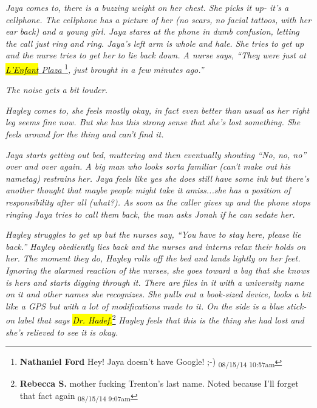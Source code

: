 \textit{Jaya comes to, there is a buzzing weight on her chest.  She picks it up- it's a cellphone.  The cellphone has a picture of her (}\textit{no scars, no facial tattoos, with her ear back}\textit{) and a young girl.  Jaya stares at the phone in dumb confusion, letting the call just ring and ring.  Jaya's left arm is whole and hale.  She tries to get up and the nurse tries to get her to lie back down.  A nurse says, ``They were just at }\underline{ \textit{ {\color[RGB]{17,85,204}\hl{L'Enfant} } }\underline{ \textit{ {\color[RGB]{17,85,204} } } }\underline{ \textit{ {\color[RGB]{17,85,204}Plaza}} } }\footnote{\textbf{Nathaniel Ford }Hey! Jaya doesn't have Google! ;-) \textsubscript{08/15/14 10:57am}}\textit{, just brought in a few minutes ago.''}



\textit{The noise gets a bit louder.  }



\textit{Hayley comes to, she feels mostly okay, in fact even better than usual as her right leg seems fine now.  But she has this strong sense that she's lost something.  She feels around for the thing and can't find it. }



\textit{Jaya starts getting out bed, muttering and then eventually shouting ``No, no, no'' over and over again.  A big man who looks sorta familiar (can't make out his nametag) restrains her.  Jaya feels like yes she does still have some ink but there's another thought that maybe people might take it amiss...she has a position of responsibility after all (what?).  As soon as the caller gives up and the phone stops ringing Jaya tries to call them back, the man asks Jonah if he can sedate her.}



\textit{Hayley struggles to get up but the nurses say, ``You have to stay here, please lie back.''  Hayley obediently lies back and the nurses and interns relax their holds on her.  The moment they do, Hayley rolls off the bed and lands lightly on her feet.  Ignoring the alarmed reaction of the nurses, she goes toward a bag that she knows is hers and starts digging through it.  There are files in it with a university name on it and other names she recognizes.  She pulls out a book-sized device, looks a bit like a GPS but with a lot of modifications made to it.  On the side is a blue stick-on label that says }\textit{\hl{Dr. Hadef.}}\footnote{\textbf{Rebecca S. }mother fucking Trenton's last name. Noted because I'll forget that fact again \textsubscript{08/15/14 9:07am}}\textit{  Hayley feels that this is the thing she had lost and she's relieved to see it is okay. }



